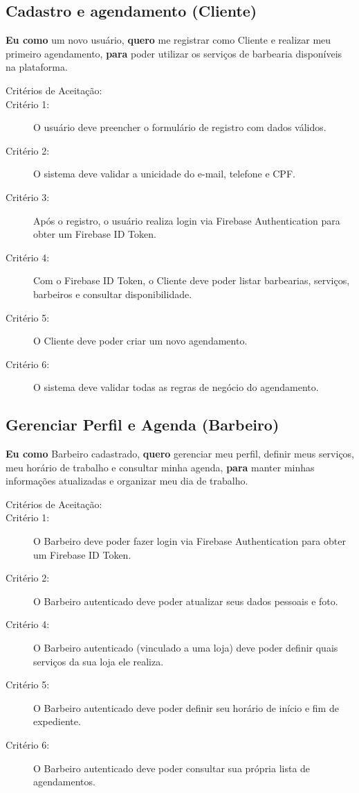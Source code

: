 \documentclass[
    12pt, 
    a4paper, 
    oneside, 
    chapter=TITLE, 
    section=TITLE
]{abntex2}
\begin{document}
\subsection{Cadastro e agendamento (Cliente)}
\textbf{Eu como} um novo usuário, \textbf{quero} me registrar como Cliente e realizar meu primeiro agendamento, \textbf{para} poder utilizar os serviços de barbearia disponíveis na plataforma.
\begin{description}
    \item[Critérios de Aceitação:]
    \item[Critério 1:] O usuário deve preencher o formulário de registro com dados válidos.
    \item[Critério 2:] O sistema deve validar a unicidade do e-mail, telefone e CPF.
    \item[Critério 3:] Após o registro, o usuário realiza login via Firebase Authentication para obter um Firebase ID Token.
    \item[Critério 4:] Com o Firebase ID Token, o Cliente deve poder listar barbearias, serviços, barbeiros e consultar disponibilidade.
    \item[Critério 5:] O Cliente deve poder criar um novo agendamento.
    \item[Critério 6:] O sistema deve validar todas as regras de negócio do agendamento.
\end{description}

\subsection{Gerenciar Perfil e Agenda (Barbeiro)}
\textbf{Eu como} Barbeiro cadastrado, \textbf{quero} gerenciar meu perfil, definir meus serviços, meu horário de trabalho e consultar minha agenda, \textbf{para} manter minhas informações atualizadas e organizar meu dia de trabalho.
\begin{description}
    \item[Critérios de Aceitação:]
    \item[Critério 1:] O Barbeiro deve poder fazer login via Firebase Authentication para obter um Firebase ID Token.
    \item[Critério 2:] O Barbeiro autenticado deve poder atualizar seus dados pessoais e foto.
    \item[Critério 4:] O Barbeiro autenticado (vinculado a uma loja) deve poder definir quais serviços da sua loja ele realiza.
    \item[Critério 5:] O Barbeiro autenticado deve poder definir seu horário de início e fim de expediente.
    \item[Critério 6:] O Barbeiro autenticado deve poder consultar sua própria lista de agendamentos.
\end{description}
\end{document}
